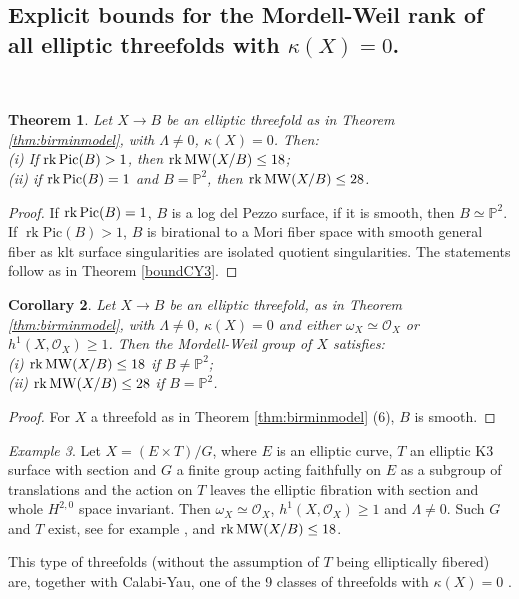 \documentclass[11pt]{amsart}
\newtheorem{theorem}{Theorem}[section]
\newtheorem{corollary}[theorem]{Corollary}
\theoremstyle{definition}
\theoremstyle{definition}
\theoremstyle{remark}
\theoremstyle{remark}
\newtheorem{example}[theorem]{Example}
\theoremstyle{definition}
\theoremstyle{conjecture}
\newcommand{\MW}{\mathrm{MW}}
\newcommand{\Pic}{\mathrm{Pic}}
\begin{document}
\subsection{Explicit bounds for the Mordell-Weil rank of all elliptic threefolds with $\kappa(X)=0$.  %
}\label{subsec:k0}~

\medskip


\begin{theorem}\label{them:boundKodZeroBNonLDP}
    Let  $X \to B$  be an elliptic  threefold as in Theorem \ref{thm:birminmodel}, 
   with  $\Lambda \neq 0$,  $\kappa(X)=0$. 
 Then:\\
(i) If  $\operatorname{rk} {\rm Pic}(B) >1$, then ${\rm rk}\, \MW(X/B)\leq 18$;\\
(ii) if $\operatorname{rk} {\rm Pic}(B) =1$ and $B = {\mathbb P}^2$, then  ${\rm rk }\, \MW(X/B)\leq 28$.
\end{theorem}
\begin{proof}   If  $\operatorname{rk} {\rm Pic}(B) =1$,  $B$ is a log del Pezzo surface, if it is smooth, then  $B  \simeq {\mathbb P}^2$.  If  $\operatorname{rk} \Pic(B) >1$, $B$ is birational to a Mori fiber space with smooth general fiber as klt surface  singularities are isolated quotient singularities. The  statements follow as in Theorem \ref{boundCY3}. \end{proof}


 \begin{corollary} \label{cor:boundKodZeroBSmooth} Let  $X \to B$  be an elliptic  threefold, %
as in Theorem \ref{thm:birminmodel},   with  $\Lambda \neq 0$,  $\kappa(X)=0$ and either $\omega_X \simeq \mathcal{O}_X$  or $h^1(X, \mathcal{O}_X) \geq 1$. 
 Then the Mordell-Weil group of $X$ satisfies:\\
(i) ${\rm rk}\, \MW(X/B)\leq 18$ if $B \neq {\mathbb P}^2$;\\
(ii) ${\rm rk }\, \MW(X/B)\leq 28$ if $B = {\mathbb P}^2$.
  \end{corollary}

\begin{proof} For $X$ a threefold as in Theorem \ref{thm:birminmodel} (6), $B$ is smooth. \end{proof}
\color{black}

\begin{example}\label{ex:k0}
Let $X=(E \times T)/G$, where $E$ is an elliptic curve, $T$ an elliptic K3 surface with section and $G$ a finite group acting faithfully on $E$ as a subgroup of translations and the action on $T$ leaves the elliptic fibration with section and whole $H^{2,0}$ space invariant. Then $\omega_X \simeq \mathcal{O}_X$, $h^1(X, \mathcal{O}_X) \geq 1$ and $\Lambda \neq 0$.
 Such $G$ and $T$ exist, see for example \cite{GarbagnatiSarti2009}, and   $ {\rm rk}\, \MW(X/B)\leq 18$.

This type of threefolds (without the assumption of $T$ being elliptically fibered) are, together with Calabi-Yau,  one of the 9 classes of threefolds with $\kappa (X)= 0$ \cite{KawamataK0, Morrison1986}.  

\end{example}
\end{document}

